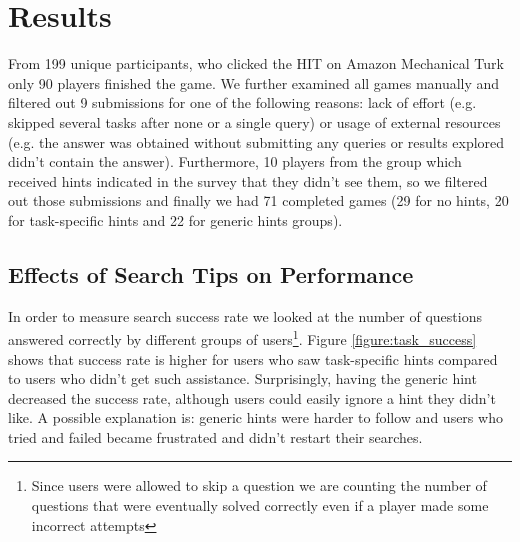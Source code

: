 \documentclass{sig-alternate}
\begin{document}
\section{Results}


From 199 unique participants, who clicked the HIT on Amazon Mechanical Turk only 90 players finished the game.
We further examined all games manually and filtered out 9 submissions for one of the following reasons: lack of effort (e.g. skipped several tasks after none or a single query) or usage of external resources (e.g. the answer was obtained without submitting any queries or results explored didn't contain the answer).
Furthermore, 10 players from the group which received hints indicated in the survey that they didn't see them, so we filtered out those submissions and finally we had 71 completed games (29 for no hints, 20 for task-specific hints and 22 for generic hints groups).

\vspace{-1mm}
\subsection{Effects of Search Tips on Performance}

In order to measure search success rate we looked at the number of questions answered correctly by different groups of users\footnote{Since users were allowed to skip a question we are counting the number of questions that were eventually solved correctly even if a player made some incorrect attempts}.
Figure \ref{figure:task_success} shows that success rate is higher for users who saw task-specific hints compared to users who didn't get such assistance.
Surprisingly, having the generic hint decreased the success rate, although users could easily ignore a hint they didn't like.
A possible explanation is: generic hints were harder to follow and users who tried and failed became frustrated and didn't restart their searches.

\end{document}

